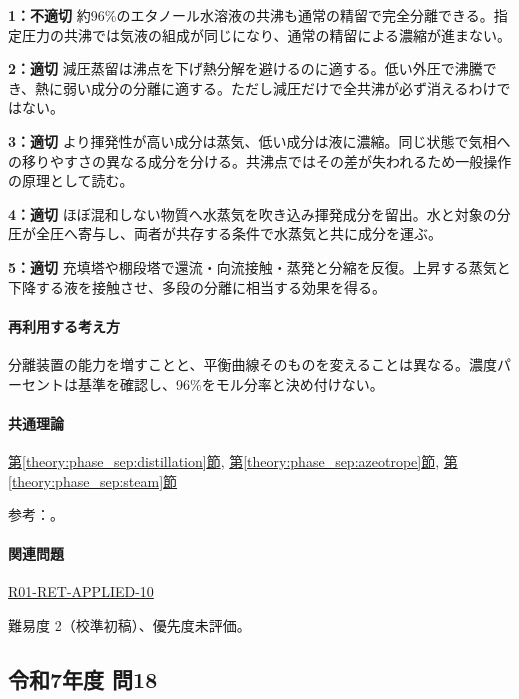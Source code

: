 \noindent\textbf{1：不適切} 約96\%のエタノール水溶液の共沸も通常の精留で完全分離できる。指定圧力の共沸では気液の組成が同じになり、通常の精留による濃縮が進まない。\par

\noindent\textbf{2：適切} 減圧蒸留は沸点を下げ熱分解を避けるのに適する。低い外圧で沸騰でき、熱に弱い成分の分離に適する。ただし減圧だけで全共沸が必ず消えるわけではない。\par

\noindent\textbf{3：適切} より揮発性が高い成分は蒸気、低い成分は液に濃縮。同じ状態で気相への移りやすさの異なる成分を分ける。共沸点ではその差が失われるため一般操作の原理として読む。\par

\noindent\textbf{4：適切} ほぼ混和しない物質へ水蒸気を吹き込み揮発成分を留出。水と対象の分圧が全圧へ寄与し、両者が共存する条件で水蒸気と共に成分を運ぶ。\par

\noindent\textbf{5：適切} 充填塔や棚段塔で還流・向流接触・蒸発と分縮を反復。上昇する蒸気と下降する液を接触させ、多段の分離に相当する効果を得る。\par

\paragraph{再利用する考え方} 分離装置の能力を増すことと、平衡曲線そのものを変えることは異なる。濃度パーセントは基準を確認し、96\%をモル分率と決め付けない。

\paragraph{共通理論} \hyperref[theory:phase_sep:distillation]{第\ref*{theory:phase_sep:distillation}節}, \hyperref[theory:phase_sep:azeotrope]{第\ref*{theory:phase_sep:azeotrope}節}, \hyperref[theory:phase_sep:steam]{第\ref*{theory:phase_sep:steam}節}

\par 参考：\cite{nptel_distillation1,nptel_azeotrope}。

\paragraph{関連問題} \hyperref[q:r01-ret-applied-10]{R01-RET-APPLIED-10}

\par 難易度 2（校準初稿）、優先度未評価。

\subsection{令和7年度 問18}
\label{q:r07-reg-applied-18}

